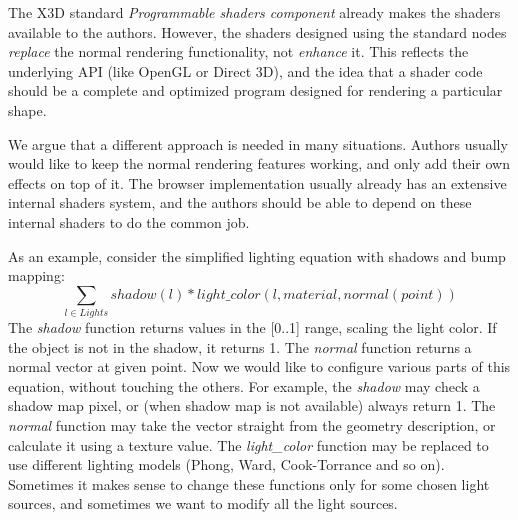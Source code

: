 \documentclass{acmsiggraph}                     %
\begin{document}
The X3D standard \textit{Programmable shaders component} already makes
the shaders available to the authors. However, the shaders designed using
the standard nodes
\textit{replace} the normal rendering functionality, not \textit{enhance} it.
This reflects the underlying API (like OpenGL or Direct 3D),
and the idea that a shader code should be a complete and optimized program
designed for rendering a particular shape.

We argue that a different approach is needed in many situations.
Authors usually would like to keep the normal rendering features working,
and only add their own effects on top of it. The browser
implementation usually already has an extensive internal shaders system,
and the authors should be able to depend on these internal shaders
to do the common job.

As an example, consider the simplified lighting equation with shadows
and bump mapping:
$$ \sum_{l\in Lights} shadow(l) * light\_color(l, material, normal(point)) $$
The \textit{shadow} function returns values in the [0..1] range,
scaling the light color. If the object is not in the shadow, it returns 1.
The \textit{normal} function returns a normal vector at given point.
Now we would like to configure various parts of this equation,
without touching the others.
For example, the \textit{shadow} may check a shadow map pixel,
or (when shadow map is not available) always return 1.
The \textit{normal} function may take the vector straight from
the geometry description, or calculate it using a texture value.
The \textit{light\_color} function may be replaced to use different
lighting models (Phong, Ward, Cook-Torrance and so on). Sometimes it makes sense
to change these functions only for some chosen light sources, and sometimes
we want to modify all the light sources.
\end{document}

